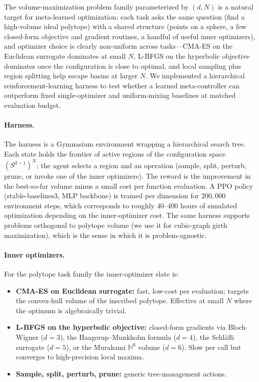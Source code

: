 \documentclass[11pt]{article}
\begin{document}
The volume-maximization problem family parameterized by $(d, N)$
is a natural target for meta-learned optimization: each task asks
the same question (find a high-volume ideal polytope) with a shared
structure (points on a sphere, a few closed-form objective and
gradient routines, a handful of useful inner optimizers), and
optimizer choice is clearly non-uniform across tasks---CMA-ES on
the Euclidean surrogate dominates at small $N$, L-BFGS on the
hyperbolic objective dominates once the configuration is close
to optimal, and local sampling plus region splitting help
escape basins at larger $N$.  We implemented a hierarchical
reinforcement-learning harness to test whether a learned
meta-controller can outperform fixed single-optimizer and
uniform-mixing baselines at matched evaluation budget.

\paragraph{Harness.}
The harness is a Gymnasium environment wrapping a hierarchical
search tree.  Each state holds the frontier of active regions of
the configuration space $(S^{d-1})^N$; the agent selects a region
and an operation (sample, split, perturb, prune, or invoke one of
the inner optimizers).  The reward is the improvement in the
best-so-far volume minus a small cost per function evaluation.
A PPO policy (stable-baselines3, MLP backbone) is trained per
dimension for $200{,}000$ environment steps, which corresponds
to roughly $40$--$400$ hours of simulated optimization depending
on the inner-optimizer cost.  The same harness supports problems
orthogonal to polytope volume (we use it for cubic-graph girth
maximization), which is the sense in which it is problem-agnostic.

\paragraph{Inner optimizers.}
For the polytope task family the inner-optimizer slate is:
\begin{itemize}
\item \textbf{CMA-ES on Euclidean surrogate:} fast, low-cost per
      evaluation; targets the convex-hull volume of the inscribed
      polytope.  Effective at small $N$ where the optimum is
      algebraically trivial.
\item \textbf{L-BFGS on the hyperbolic objective:} closed-form
      gradients via Bloch--Wigner ($d = 3$), the Haagerup--Munkholm
      formula ($d = 4$), the Schl\"afli surrogate ($d = 5$), or
      the Murakami $\mathbb{H}^6$ volume ($d = 6$).  Slow per call
      but converges to high-precision local maxima.
\item \textbf{Sample, split, perturb, prune:} generic
      tree-management actions.
\end{itemize}
\end{document}
